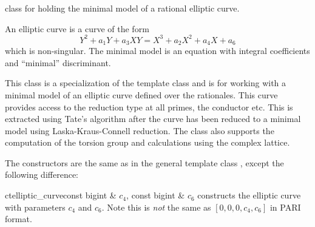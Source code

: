 

\NAME

 \dotfill class for holding the minimal model of a rational
elliptic curve.



\ABSTRACT

An elliptic curve is a curve of the form
\begin{displaymath}
  Y^2 + a_1 Y + a_3 X Y = X^3 + a_2 X^2 + a_4 X + a_6
\end{displaymath}
which is non-singular.  The minimal model is an equation with integral coefficients and
``minimal'' discriminant.



\DESCRIPTION

This class is a specialization of the template class  and is for
working with a minimal model of an elliptic curve defined over the rationales.  This curve
provides access to the reduction type at all primes, the conductor etc.  This is extracted using
Tate's algorithm after the curve has been reduced to a minimal model using Laska-Kraus-Connell
reduction.  The class also supports the computation of the torsion group and calculations using
the complex lattice.



\CONS

The constructors are the same as in the general template class ,
except the following difference:

\begin{fcode}{ct}{elliptic_curve}{const bigint & $c_4$, const bigint & $c_6$}
  constructs the elliptic curve with parameters $c_4$ and $c_6$.  Note this is \emph{not} the
  same as $[0,0,0,c_4,c_6]$ in PARI format.
\end{fcode}



